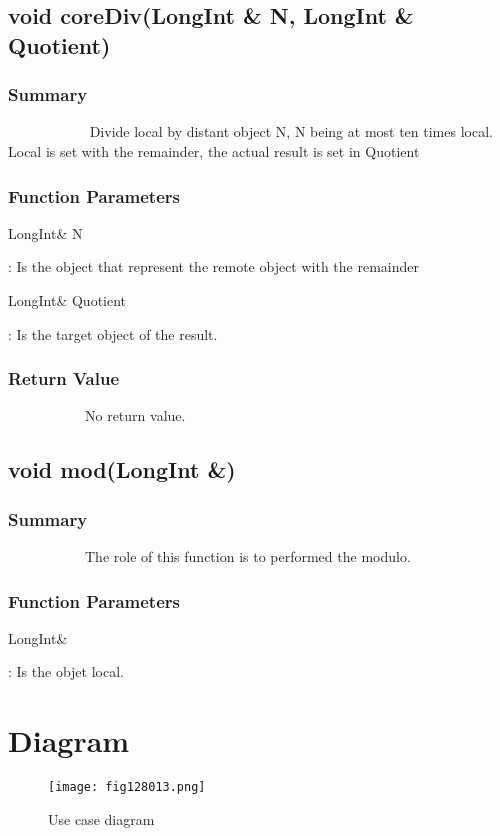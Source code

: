 \documentclass[11pt]{report}
\begin{document}
\section{void coreDiv(LongInt \& N, LongInt \& Quotient)}
	\subsection{Summary}
~~~~~~~~~~~ Divide local by distant object N, N being at most ten times local. Local is set with the remainder,
 the actual result is set in Quotient
	\subsection{Function Parameters}
	\begin{tabbing} 
\begin{bf}LongInt\& N \end{bf}: Is the object that represent the remote object with the remainder\\
\begin{bf}LongInt\&  Quotient \end{bf}: Is the target object of the result.\\
	\end{tabbing} 

\subsection{Return Value}
~~~~~~~~~~~No return value.

\section{void mod(LongInt \&)}
	\subsection{Summary}
~~~~~~~~~~~The role of this function is to performed the modulo.
	\subsection{Function Parameters}
	\begin{tabbing} 
\begin{bf}LongInt\&\end{bf}: Is the objet local.\\
	\end{tabbing} 

 \chapter*{Diagram}  
	
	\begin{figure}[!h] %
	\texttt{[image: fig128013.png]} %
	\caption{Use case diagram} %
	\label{Use case diagram} %
	\end{figure} %

   
\end{document}
